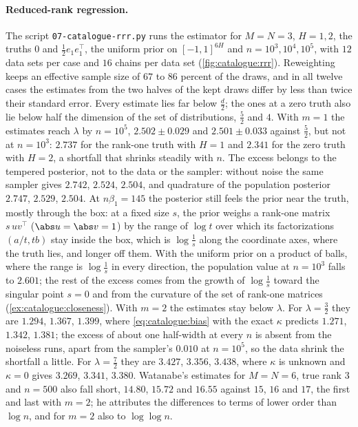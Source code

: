 \begin{refsection}
\paragraph{Reduced-rank regression.} The script \texttt{07-catalogue-rrr.py} runs the estimator for $M=N=3$, $H=1,2$, the truths $0$ and $\frac12e_1e_1^\top$, the uniform prior on $[-1,1]^{6H}$ and $n=10^3,10^4,10^5$, with $12$ data sets per case and $16$ chains per data set (\cref{fig:catalogue:rrr}). Reweighting keeps an effective sample size of $67$ to $86$ percent of the draws, and in all twelve cases the estimates from the two halves of the kept draws differ by less than twice their standard error. Every estimate lies far below $\frac d2$; the ones at a zero truth also lie below half the dimension of the set of distributions, $\frac52$ and $4$. With $m=1$ the estimates reach $\lambda$ by $n=10^5$, $2.502\pm0.029$ and $2.501\pm0.033$ against $\frac52$, but not at $n=10^3$: $2.737$ for the rank-one truth with $H=1$ and $2.341$ for the zero truth with $H=2$, a shortfall that shrinks steadily with $n$. The excess belongs to the tempered posterior, not to the data or the sampler: without noise the same sampler gives $2.742$, $2.524$, $2.504$, and quadrature of the population posterior $2.747$, $2.529$, $2.504$. At $n\beta_1=145$ the posterior still feels the prior near the truth, mostly through the box: at a fixed size $s$, the prior weighs a rank-one matrix $s\,uv^\top$ ($\abs u=\abs v=1$) by the range of $\log t$ over which its factorizations $(a/t,tb)$ stay inside the box, which is $\log\frac1s$ along the coordinate axes, where the truth lies, and longer off them. With the uniform prior on a product of balls, where the range is $\log\frac1s$ in every direction, the population value at $n=10^3$ falls to $2.601$; the rest of the excess comes from the growth of $\log\frac1s$ toward the singular point $s=0$ and from the curvature of the set of rank-one matrices (\cref{ex:catalogue:closeness}). With $m=2$ the estimates stay below $\lambda$. For $\lambda=\frac32$ they are $1.294$, $1.367$, $1.399$, where \eqref{eq:catalogue:bias} with the exact $\kappa$ predicts $1.271$, $1.342$, $1.381$; the excess of about one half-width at every $n$ is absent from the noiseless runs, apart from the sampler's $0.010$ at $n=10^5$, so the data shrink the shortfall a little. For $\lambda=\frac72$ they are $3.427$, $3.356$, $3.438$, where $\kappa$ is unknown and $\kappa=0$ gives $3.269$, $3.341$, $3.380$. Watanabe's estimates for $M=N=6$, true rank $3$ and $n=500$ \parencite[Table~3]{Watanabe2013} also fall short, $14.80$, $15.72$ and $16.55$ against $15$, $16$ and $17$, the first and last with $m=2$; he attributes the differences to terms of lower order than $\log n$, and for $m=2$ also to $\log\log n$.


\end{refsection}
